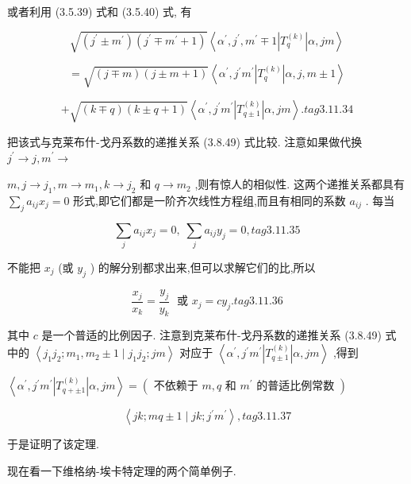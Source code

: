 或者利用 (3.5.39) 式和 (3.5.40) 式, 有

$$
\sqrt{\left( {{j}^{\prime } \pm {m}^{\prime }}\right) \left( {{j}^{\prime } \mp {m}^{\prime } + 1}\right) }\left\langle {{\alpha }^{\prime },{j}^{\prime },{m}^{\prime } \mp 1\left| {T}_{q}^{\left( k\right) }\right| \alpha ,{jm}}\right\rangle
$$

$$
= \sqrt{\left( {j \mp m}\right) \left( {j \pm m + 1}\right) }\left\langle {{\alpha }^{\prime },{j}^{\prime }{m}^{\prime }\left| {T}_{q}^{\left( k\right) }\right| \alpha, j, m \pm 1}\right\rangle
$$

$$
+ \sqrt{\left( {k \mp q}\right) \left( {k \pm q + 1}\right) }\left\langle {{\alpha }^{\prime },{j}^{\prime }{m}^{\prime }\left| {T}_{q \pm 1}^{\left( k\right) }\right| \alpha ,{jm}}\right\rangle . tag{3.11.34}
$$

把该式与克莱布什-戈丹系数的递推关系 (3.8.49) 式比较. 注意如果做代换 ${j}^{\prime } \rightarrow j,{m}^{\prime } \rightarrow$

$m, j \rightarrow {j}_{1}, m \rightarrow {m}_{1}, k \rightarrow {j}_{2}$ 和 $q \rightarrow {m}_{2}$ ,则有惊人的相似性. 这两个递推关系都具有 $\mathop{\sum }\limits_{j}{a}_{ij}{x}_{j} = 0$ 形式,即它们都是一阶齐次线性方程组,而且有相同的系数 ${a}_{ij}$ . 每当

$$
\mathop{\sum }\limits_{j}{a}_{ij}{x}_{j} = 0,\;\mathop{\sum }\limits_{j}{a}_{ij}{y}_{j} = 0, tag{3.11.35}
$$

不能把 ${x}_{j}$ (或 ${y}_{j}$ ) 的解分别都求出来,但可以求解它们的比,所以

$$
\frac{{x}_{j}}{{x}_{k}} = \frac{{y}_{j}}{{y}_{k}}\;\text{ 或 }{x}_{j} = c{y}_{j}. tag{3.11.36}
$$

其中 $c$ 是一个普适的比例因子. 注意到克莱布什-戈丹系数的递推关系 (3.8.49) 式中的 $\left\langle {{j}_{1}{j}_{2};{m}_{1},{m}_{2} \pm 1 \mid {j}_{1}{j}_{2};{jm}}\right\rangle$ 对应于 $\left\langle {{\alpha }^{\prime },{j}^{\prime }{m}^{\prime }\left| {T}_{q \pm 1}^{\left( k\right) }\right| \alpha ,{jm}}\right\rangle$ ,得到

$\left\langle {{\alpha }^{\prime },{j}^{\prime }{m}^{\prime }\left| {T}_{q + \pm 1}^{\left( k\right) }\right| \alpha ,{jm}}\right\rangle = \left( {\text{ 不依赖于 }m, q\text{ 和 }{m}^{\prime }\text{ 的普适比例常数 }}\right)$

$$
\left\langle {{jk};{mq} \pm 1 \mid {jk};{j}^{\prime }{m}^{\prime }}\right\rangle , tag{3.11.37}
$$

于是证明了该定理.

现在看一下维格纳-埃卡特定理的两个简单例子.

